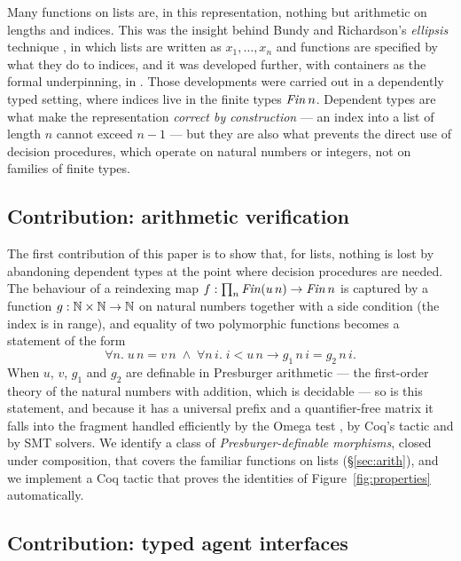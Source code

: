 \documentclass{fundam}
\begin{document}
Many functions on lists are, in this representation, nothing but arithmetic on lengths and
indices.  This was the insight behind Bundy and Richardson's \emph{ellipsis}
technique \cite{BundyRichardson99}, in which lists are written as
$x_1,\dots,x_n$ and functions are specified by what they do to indices, and it was
developed further, with containers as the formal underpinning, in
\cite{PrinceGhaniMcBride08}.  Those developments were carried out in a dependently typed
setting, where indices live in the finite types $\mathit{Fin}\,n$.  Dependent types are what make
the representation \emph{correct by construction} --- an index into a list of length $n$
cannot exceed $n-1$ --- but they are also what prevents the direct use of decision
procedures, which operate on natural numbers or integers, not on families of finite types.

\subsection{Contribution: arithmetic verification}

The first contribution of this paper is to show that, for lists, nothing is lost by
abandoning dependent types at the point where decision procedures are needed.  The
behaviour of a reindexing map $f : \prod_n \mathit{Fin}(u\,n) \to \mathit{Fin}\,n$ is captured by a
function $g : \mathbb{N} \times \mathbb{N} \to \mathbb{N}$ on natural numbers together with a side condition
(the index is in range), and equality of two polymorphic functions becomes a statement of
the form
\[
  \forall n.\; u\,n = v\,n \;\wedge\; \forall n\,i.\; i < u\,n \to g_1\,n\,i = g_2\,n\,i .
\]
When $u$, $v$, $g_1$ and $g_2$ are definable in Presburger arithmetic --- the first-order
theory of the natural numbers with addition, which is decidable \cite{Presburger29} --- so
is this statement, and because it has a universal prefix and a quantifier-free matrix it
falls into the fragment handled efficiently by the Omega test \cite{Pugh91}, by Coq's
 tactic and by SMT solvers.  We identify a class of
\emph{Presburger-definable morphisms}, closed under composition, that covers the
familiar functions on lists (\S\ref{sec:arith}), and we implement a Coq tactic that proves
the identities of Figure~\ref{fig:properties} automatically.

\subsection{Contribution: typed agent interfaces}
\end{document}
